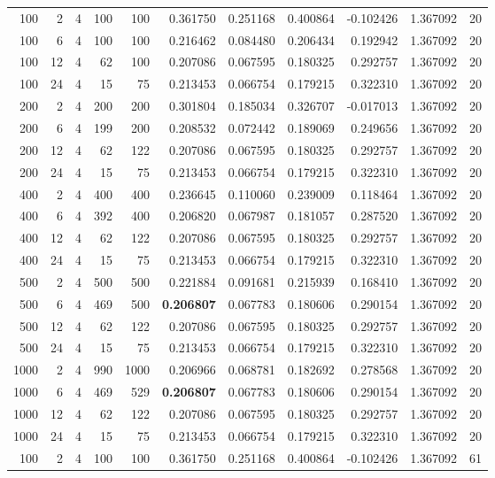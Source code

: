 \begin{table}
\begin{tabular}{rrrrrrrrrrr}
100 & 2 & 4 & 100 & 100 & 0.361750 & 0.251168 & 0.400864 & -0.102426 & 1.367092 & 20 \\
100 & 6 & 4 & 100 & 100 & 0.216462 & 0.084480 & 0.206434 & 0.192942 & 1.367092 & 20 \\
100 & 12 & 4 & 62 & 100 & 0.207086 & 0.067595 & 0.180325 & 0.292757 & 1.367092 & 20 \\
100 & 24 & 4 & 15 & 75 & 0.213453 & 0.066754 & 0.179215 & 0.322310 & 1.367092 & 20 \\
200 & 2 & 4 & 200 & 200 & 0.301804 & 0.185034 & 0.326707 & -0.017013 & 1.367092 & 20 \\
200 & 6 & 4 & 199 & 200 & 0.208532 & 0.072442 & 0.189069 & 0.249656 & 1.367092 & 20 \\
200 & 12 & 4 & 62 & 122 & 0.207086 & 0.067595 & 0.180325 & 0.292757 & 1.367092 & 20 \\
200 & 24 & 4 & 15 & 75 & 0.213453 & 0.066754 & 0.179215 & 0.322310 & 1.367092 & 20 \\
400 & 2 & 4 & 400 & 400 & 0.236645 & 0.110060 & 0.239009 & 0.118464 & 1.367092 & 20 \\
400 & 6 & 4 & 392 & 400 & 0.206820 & 0.067987 & 0.181057 & 0.287520 & 1.367092 & 20 \\
400 & 12 & 4 & 62 & 122 & 0.207086 & 0.067595 & 0.180325 & 0.292757 & 1.367092 & 20 \\
400 & 24 & 4 & 15 & 75 & 0.213453 & 0.066754 & 0.179215 & 0.322310 & 1.367092 & 20 \\
500 & 2 & 4 & 500 & 500 & 0.221884 & 0.091681 & 0.215939 & 0.168410 & 1.367092 & 20 \\
500 & 6 & 4 & 469 & 500 & \textbf{0.206807} & 0.067783 & 0.180606 & 0.290154 & 1.367092 & 20 \\
500 & 12 & 4 & 62 & 122 & 0.207086 & 0.067595 & 0.180325 & 0.292757 & 1.367092 & 20 \\
500 & 24 & 4 & 15 & 75 & 0.213453 & 0.066754 & 0.179215 & 0.322310 & 1.367092 & 20 \\
1000 & 2 & 4 & 990 & 1000 & 0.206966 & 0.068781 & 0.182692 & 0.278568 & 1.367092 & 20 \\
1000 & 6 & 4 & 469 & 529 & \textbf{0.206807} & 0.067783 & 0.180606 & 0.290154 & 1.367092 & 20 \\
1000 & 12 & 4 & 62 & 122 & 0.207086 & 0.067595 & 0.180325 & 0.292757 & 1.367092 & 20 \\
1000 & 24 & 4 & 15 & 75 & 0.213453 & 0.066754 & 0.179215 & 0.322310 & 1.367092 & 20 \\
100 & 2 & 4 & 100 & 100 & 0.361750 & 0.251168 & 0.400864 & -0.102426 & 1.367092 & 61 \\

\end{tabular}
\end{table}
